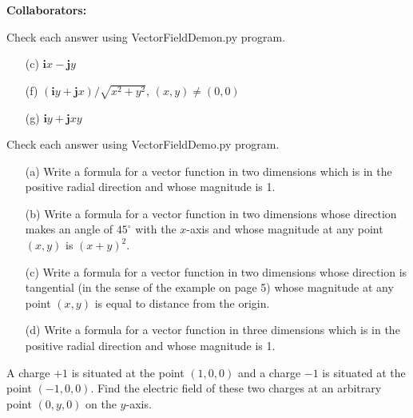 \documentclass[11pt,letterpaper,boxed]{hmcpset}
\begin{document}
	
	\noindent\textbf{Collaborators:} 
	
	
	\begin{problem}[Schey I-1 (c,f,g)]
		Check each answer using VectorFieldDemon.py program.
		\begin{enumerate}
			\item[(c)] $\textbf{i}x - \textbf{j}y$
			\item[(f)] $(\textbf{i}y + \textbf{j}x)/\sqrt{x^2+y^2}$, $(x,y) \neq (0,0)$
			\item[(g)] $\textbf{i}y + \textbf{j}xy$
		\end{enumerate}
		
	\end{problem}
	
	\begin{solution}
		\vfill
	\end{solution}
	\newpage
	
	
	\begin{problem}[Schey I-3]
		Check each answer using VectorFieldDemo.py program.
		\begin{enumerate}
			\item[(a)] Write a formula for a vector function in two dimensions which is in the positive radial direction and whose magnitude is 1.
			\item[(b)] Write a formula for a vector function in two dimensions whose direction makes an angle of $45^{\circ}$ with the $x$-axis and whose magnitude at any point $(x,y)$ is $(x+y)^2$.
			\item[(c)] Write a formula for a vector function in two dimensions whose direction is tangential (in the sense of the example on page 5) whose magnitude at any point $(x,y)$ is equal to distance from the origin.
			\item[(d)] Write a formula for a vector function in three dimensions which is in the positive radial direction and whose magnitude is 1.
		\end{enumerate}
	\end{problem}
	
	\begin{solution}
		\vfill
	\end{solution}
	\newpage
	
	
	\begin{problem}[Schey I-5]
		A charge $+1$ is situated at the point $(1,0,0)$ and a charge $-1$ is situated at the point $(-1,0,0)$. Find the electric field of these two charges at an arbitrary point $(0,y,0)$ on the $y$-axis.
			
	\end{problem}
	
\end{document}
